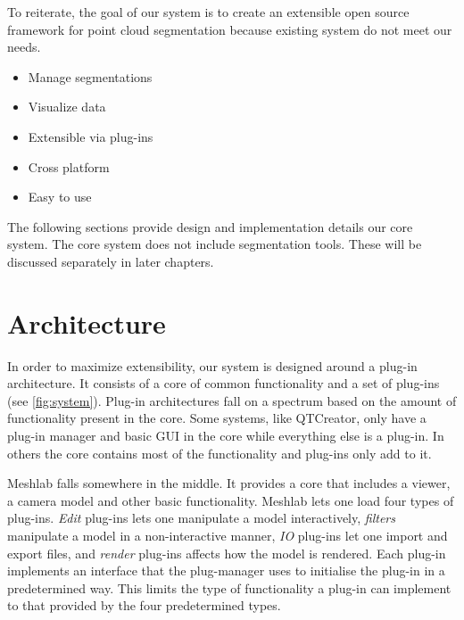 To reiterate, the goal of our system is to create an extensible open source framework for point cloud segmentation because existing system do not meet our needs.

\begin{itemize}
\item{Manage segmentations}
\item{Visualize data}
\item{Extensible via plug-ins}
\item{Cross platform}
\item{Easy to use}
\end{itemize}

The following sections provide design and implementation details our core system. The core system does not include segmentation tools. These will be discussed separately in later chapters.


\section{Architecture}

In order to maximize extensibility, our system is designed around a plug-in architecture. It consists of a core of common functionality and a set of plug-ins (see \autoref{fig:system}). Plug-in architectures fall on a spectrum based on the amount of functionality present in the core. Some systems, like QTCreator, only have a plug-in manager and basic GUI in the core while everything else is a plug-in. In others the core contains most of the functionality and plug-ins only add to it.

Meshlab falls somewhere in the middle. It provides a core that includes a viewer, a camera model and other basic functionality. Meshlab lets one load four types of plug-ins. \emph{Edit} plug-ins lets one manipulate a model interactively, \emph{filters} manipulate a model in a non-interactive manner, \emph{IO} plug-ins let one import and export files, and \emph{render} plug-ins affects how the model is rendered. Each plug-in implements an interface that the plug-manager uses to initialise the plug-in in a predetermined way. This limits the type of functionality a plug-in can implement to that provided by the four predetermined types.

